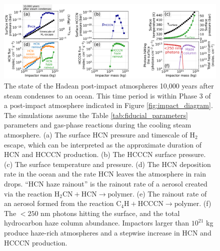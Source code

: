 \begin{figure}
  \centering
  \includegraphics[width=1.0\textwidth]{tex/5impacts/figures/Figure5.pdf}
  \caption{The state of the Hadean post-impact atmospheres 10,000 years after steam condenses to an ocean. This time period is within Phase 3 of a post-impact atmosphere indicated in Figure \ref{fig:impact_diagram}. The simulations assume the Table \ref{tab:fiducial_parameters} parameters and gas-phase reactions during the cooling steam atmosphere. (a) The surface HCN pressure and timescale of H$_2$ escape, which can be interpreted as the approximate duration of HCN and HCCCN production. (b) The HCCCN surface pressure. (c) The surface temperature and pressure. (d) The HCN deposition rate in the ocean and the rate HCN leaves the atmosphere in rain drops. ``HCN haze rainout'' is the rainout rate of a aerosol created via the reaction $\mathrm{H_2CN} + \mathrm{HCN} \rightarrow \mathrm{polymer}$. (e) The rainout rate of an aerosol formed from the reaction $\mathrm{C_4H} + \mathrm{HCCCN} \rightarrow \mathrm{polymer}$. (f) The $< 250$ nm photons hitting the surface, and the total hydrocarbon haze column abundance. Impactors larger than $10^{21}$ kg produce haze-rich atmospheres and a stepwise increase in HCN and HCCCN production.}
  \label{fig:figure5}
\end{figure}

